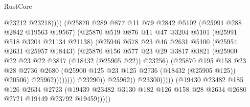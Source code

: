 \begin{lexlean}{RustCore}
\begin{coremodule}
                                          @23212
                                          @23218))))
                                  (@25870
                                    @289
                                    @877
                                    @11
                                    @79
                                    @2842
                                    @5102
                                    (@25991 @288 @2842 @19563 @19567)
                                    (@25870
                                      @519
                                      @876
                                      @11
                                      @47
                                      @3204
                                      @5101
                                      (@25991 @518 @3204 @21134 @21138)
                                      (@25946
                                        @578
                                        @23
                                        @46
                                        @2631
                                        @5100
                                        (@25954 @2631 @25957 @18443)
                                        (@25870
                                          @156
                                          @577
                                          @23
                                          @29
                                          @3817
                                          @3821
                                          (@25900 @22 @23 @22 @3817 (@18432 (@25905 @22)) @23256)
                                          (@25870
                                            @195
                                            @158
                                            @23
                                            @28
                                            @2736
                                            @2680
                                            (@25900
                                              @125
                                              @23
                                              @125
                                              @2736
                                              (@18432 (@25905 @125))
                                              @20506)
                                            @25962))))))))
                            @23290))
                        @25962))
                    @23300)))))
          (@19430
            @23482
            @185
            @126
            @2634
            @2723
            (@19439 @23482 @3130 @182 @126 @158 @28 @2634 @2680 @2721 @19449 @23792 @19459)))))

\end{coremodule}
\end{lexlean}
